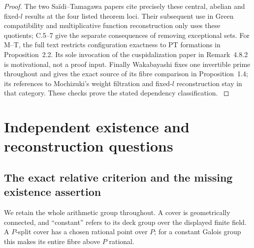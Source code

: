 \documentclass[11pt,a4paper]{article}
\begin{document}
\begin{proof}
The two Sa\"idi--Tamagawa papers cite precisely these central,
abelian and fixed-$l$ results at the four listed theorem loci.
Their subsequent use in Green compatibility and multiplicative
function reconstruction only uses these quotients; C.5--7
give the separate consequences of removing exceptional sets.
For M--T, the full text restricts configuration exactness to
PT formations in Proposition~2.2. Its sole invocation of the
cuspidalization paper in Remark~4.8.2 is motivational, not a
proof input. Finally Wakabayashi fixes one invertible prime
throughout and gives the exact source of its fibre comparison
in Proposition~1.4; its references to Mochizuki's weight
filtration and fixed-$l$ reconstruction stay in that category.
These checks prove the stated dependency classification.
\citep[Propositions~1.8,1.12,1.14--1.16,1.19,3.8--3.9;
Theorem~3.10]{LA_Mochizuki2007}
\citep[Proposition~2.2, Remark~4.8.2]{LA_MT2008}
\citep[\S2, Remark~3.14]{LA_ST2009}
\citep[\S3]{LA_ST2017}
\citep[Proposition~1.4, Theorems~3.9,4.4]{LA_Wakabayashi2016}
\end{proof}


\section{Independent existence and reconstruction questions}
\subsection{The exact relative criterion and the missing existence assertion}

We retain the whole arithmetic group throughout. A cover is
geometrically connected, and ``constant'' refers to its deck group
over the displayed finite field. A $P$-split cover has a chosen rational
point over $P$; for a constant Galois group this makes its entire fibre
above $P$ rational.
\end{document}
